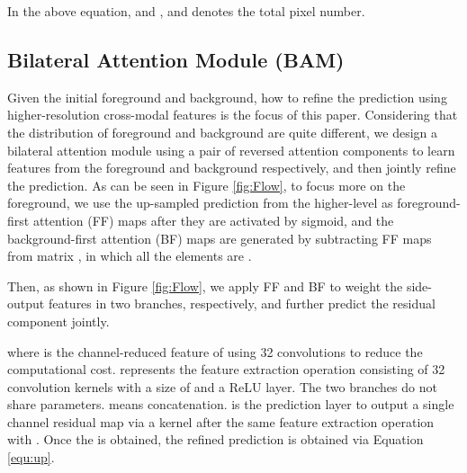 \documentclass[journal]{IEEEtran}
\newcommand{\figref}[1]{Figure \ref{#1}}
\newcommand{\equref}[1]{Equation \ref{#1}}
\begin{document}
In the above equation,  and , and  denotes the total pixel number.  



\subsection{Bilateral Attention Module (BAM)}\label{sec:BAM}
\vspace{-3pt}
Given the initial foreground and background,
how to refine the prediction using higher-resolution cross-modal features is the focus of this paper.
Considering that the distribution of foreground and background are quite different,
we design a bilateral attention module using a pair of reversed attention components to
learn features from the foreground and background respectively, and then jointly refine the prediction.
As can be seen in \figref{fig:Flow}, 
to focus more on the foreground,
we use the up-sampled prediction from the higher-level as foreground-first attention (FF) maps  after they are activated by sigmoid,
and the background-first attention (BF) maps  are generated by subtracting FF maps from matrix , in which all the elements are .

Then, as shown in \figref{fig:Flow}, we apply FF and BF to weight the side-output features in two branches, respectively, and further predict the residual component jointly.

where  is the channel-reduced feature of  using 32  convolutions to reduce the computational cost.
 represents the feature extraction operation consisting of 32 convolution kernels with a size of  and a ReLU layer.
The two branches do not share parameters.
 means concatenation.
 is the prediction layer to output a single channel residual map via a  kernel after the same feature extraction operation with .
Once the  is obtained, the refined prediction  is obtained via \equref{equ:up}.
\end{document}
